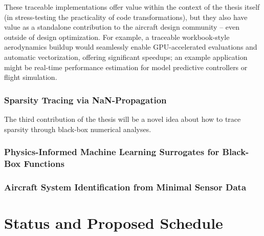 \documentclass[12pt,vi,oneside]{report}
\begin{document}
    These traceable implementations offer value within the context of the thesis itself (in stress-testing the practicality of code transformations), but they also have value as a standalone contribution to the aircraft design community -- even outside of design optimization. For example, a traceable workbook-style aerodynamics buildup would seamlessly enable GPU-accelerated evaluations and automatic vectorization, offering significant speedups; an example application might be real-time performance estimation for model predictive controllers or flight simulation.

    \subsection{Sparsity Tracing via NaN-Propagation}

    The third contribution of the thesis will be a novel idea about how to trace sparsity through black-box numerical analyses.

    \subsection{Physics-Informed Machine Learning Surrogates for Black-Box Functions}

%

    \subsection{Aircraft System Identification from Minimal Sensor Data}


    \chapter{Status and Proposed Schedule}
    \label{sec:status}
\end{document}
